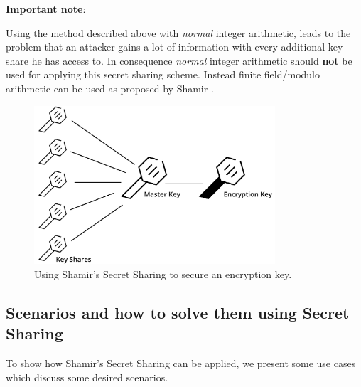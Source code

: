 \documentclass[runningheads]{llncs}
\begin{document}
\noindent
\textbf{Important note}:
\newline

\noindent
Using the method described above with \textit{normal} integer arithmetic, leads to the problem that an attacker gains a lot of information with every additional key share he has access to. In consequence \textit{normal} integer arithmetic should \textbf{not} be used for applying this secret sharing scheme. Instead finite field/modulo arithmetic can be used as proposed by Shamir \cite{shamir}.

\begin{figure}
    \centering
    \includegraphics[width=0.8\textwidth]{images/shamir.png}
    \caption{Using Shamir's Secret Sharing to secure an encryption key.}
    \label{shamir}
\end{figure}

\subsection{Scenarios and how to solve them using Secret Sharing}

To show how Shamir's Secret Sharing can be applied, we present some use cases which discuss some desired scenarios.
\newline
\end{document}
